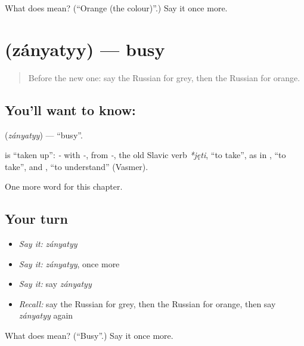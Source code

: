 \begin{tcolorbox}[breakable,colback=teal!4,colframe=teal!35!black,title={Before you move on}]
What does  mean? (\textquotedblleft{}Orange (the colour)\textquotedblright{}.) Say it once more.
\end{tcolorbox}
\section[\texorpdfstring{\ru{занятый} (zányatyy)}{занятый (zányatyy)}]{ (zányatyy) — busy}

\label{lesson:RU-C124-busy}



\begin{quote}
Before the new one: say the Russian for grey, then the Russian for orange.
\end{quote}

\subsection*{You'll want to know: }
\textbf{} (\emph{zányatyy}) — \textquotedblleft{}busy\textquotedblright{}.

\begin{cousinweb}
\textbf{} is \textquotedblleft{}taken up\textquotedblright{}: \emph{-} with \emph{-}, from \emph{-}, the old Slavic verb \emph{*jęti}, \textquotedblleft{}to take\textquotedblright{}, as in \emph{}, \textquotedblleft{}to take\textquotedblright{}, and \emph{}, \textquotedblleft{}to understand\textquotedblright{} (Vasmer).
\end{cousinweb}

\begin{grammarlens}[title={What you've built}]
One more word for this chapter.
\end{grammarlens}

\subsection*{Your turn}
\begin{itemize}
\raggedright
  \item \emph{Say it:} \emph{zányatyy}
  \item \emph{Say it:} \emph{zányatyy}, once more
  \item \emph{Say it:} say \emph{zányatyy}
  \item \emph{Recall:} say the Russian for grey, then the Russian for orange, then say \emph{zányatyy} again
\end{itemize}

\begin{tcolorbox}[breakable,colback=teal!4,colframe=teal!35!black,title={Before you move on}]
What does  mean? (\textquotedblleft{}Busy\textquotedblright{}.) Say it once more.
\end{tcolorbox}
